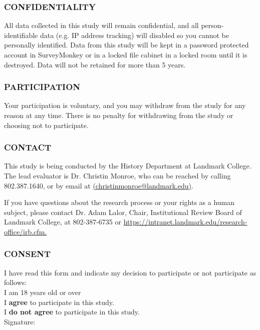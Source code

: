 \documentclass[11pt]{sig-alternate}
\begin{document}
\begin{large}
\subsubsection*{\textbf{CONFIDENTIALITY}}
All data collected in this study will remain confidential, and all person-identifiable data (e.g. IP address tracking) will disabled so you cannot be personally identified. Data from this study will be kept in a password protected account in SurveyMonkey or in a locked file cabinet in a locked room until it is destroyed. Data will not be retained for more than 5 years.

\subsubsection*{\textbf{PARTICIPATION}}
Your participation is voluntary, and you may withdraw from the study for any reason at any time. There is no penalty for withdrawing from the study or choosing not to participate. 

\subsubsection*{\textbf{CONTACT}}
This study is being conducted by the History Department at Landmark College. The lead evaluator is Dr. Christin Monroe, who can be reached by calling 802.387.1640, or by email at \href{mailto:csupalo@ets.org}{(christinmonroe@landmark.edu)}. 

If you have questions about the research process or your rights as a human subject, please contact Dr. Adam Lalor, Chair, Institutional Review Board of Landmark College, at 802-387-6735 or \url{https://intranet.landmark.edu/research-office/irb.cfm.}

\subsubsection*{\textbf{CONSENT}}
I have read this form and indicate my decision to participate or not participate as follows:\\

I am 18 years old or over\\

I \textbf{agree} to participate in this study.\\

I \textbf{do not agree} to participate in this study.\\

Signature:\\


\end{large}
\end{document}
